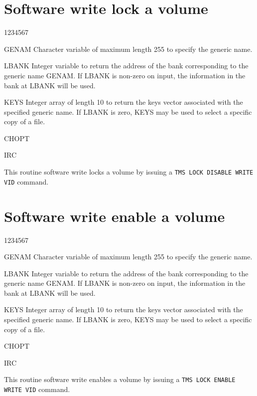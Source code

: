 \section{Software write lock a volume}
\begin{DLtt}{1234567}
\item[GENAM]
Character variable of maximum length 255 to specify the generic name.
\item[LBANK]
Integer variable to return the address of the bank corresponding
to the generic name GENAM.
If LBANK is non-zero on input, the information in the 
bank at LBANK will be used.
\item[KEYS]
Integer array of length 10 to return the keys vector associated
with the specified generic name.
If LBANK is zero, KEYS may be used to select a specific
copy of a file.
\item[CHOPT]
\item[IRC]
\end{DLtt}

This routine software write locks a volume by issuing a
{\tt TMS LOCK DISABLE WRITE VID} command.

\section{Software write enable a volume}
\begin{DLtt}{1234567}
\item[GENAM]
Character variable of maximum length 255 to specify the generic name.
\item[LBANK]
Integer variable to return the address of the bank corresponding
to the generic name GENAM.
If LBANK is non-zero on input, the information in the 
bank at LBANK will be used.
\item[KEYS]
Integer array of length 10 to return the keys vector associated
with the specified generic name.
If LBANK is zero, KEYS may be used to select a specific
copy of a file.
\item[CHOPT]
\item[IRC]
\end{DLtt}

This routine software write enables a volume by issuing a
{\tt TMS LOCK ENABLE WRITE VID} command.

